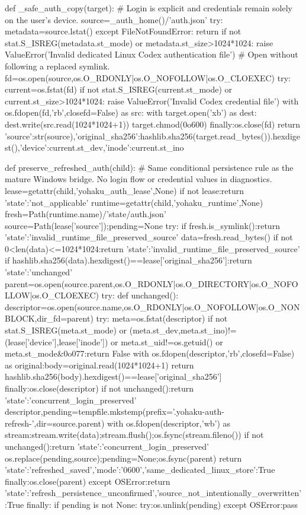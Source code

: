 def _safe_auth_copy(target):
    # Login is explicit and credentials remain solely on the user's device.
    source=_auth_home()/'auth.json'
    try:
        metadata=source.lstat()
    except FileNotFoundError:
        return
    if not stat.S_ISREG(metadata.st_mode) or metadata.st_size>1024*1024:
        raise ValueError('Invalid dedicated Linux Codex authentication file')
    # Open without following a replaced symlink.
    fd=os.open(source,os.O_RDONLY|os.O_NOFOLLOW|os.O_CLOEXEC)
    try:
        current=os.fstat(fd)
        if not stat.S_ISREG(current.st_mode) or current.st_size>1024*1024:
            raise ValueError('Invalid Codex credential file')
        with os.fdopen(fd,'rb',closefd=False) as src:
            with target.open('xb') as dest:
                dest.write(src.read(1024*1024+1))
        target.chmod(0o600)
    finally:os.close(fd)
    return {'source':str(source),'original_sha256':hashlib.sha256(target.read_bytes()).hexdigest(),'device':current.st_dev,'inode':current.st_ino}


def preserve_refreshed_auth(child):
    # Same conditional persistence rule as the mature Windows bridge. No login flow or credential values in diagnostics.
    lease=getattr(child,'yohaku_auth_lease',None)
    if not lease:return {'state':'not_applicable'}
    runtime=getattr(child,'yohaku_runtime',None)
    fresh=Path(runtime.name)/'state/auth.json'
    source=Path(lease['source']);pending=None
    try:
        if fresh.is_symlink():return {'state':'invalid_runtime_file_preserved_source'}
        data=fresh.read_bytes()
        if not 0<len(data)<=1024*1024:return {'state':'invalid_runtime_file_preserved_source'}
        if hashlib.sha256(data).hexdigest()==lease['original_sha256']:return {'state':'unchanged'}
        parent=os.open(source.parent,os.O_RDONLY|os.O_DIRECTORY|os.O_NOFOLLOW|os.O_CLOEXEC)
        try:
            def unchanged():
                descriptor=os.open(source.name,os.O_RDONLY|os.O_NOFOLLOW|os.O_NONBLOCK,dir_fd=parent)
                try:
                    meta=os.fstat(descriptor)
                    if not stat.S_ISREG(meta.st_mode) or (meta.st_dev,meta.st_ino)!=(lease['device'],lease['inode']) or meta.st_uid!=os.getuid() or meta.st_mode&0o077:return False
                    with os.fdopen(descriptor,'rb',closefd=False) as original:body=original.read(1024*1024+1)
                    return hashlib.sha256(body).hexdigest()==lease['original_sha256']
                finally:os.close(descriptor)
            if not unchanged():return {'state':'concurrent_login_preserved'}
            descriptor,pending=tempfile.mkstemp(prefix='.yohaku-auth-refresh-',dir=source.parent)
            with os.fdopen(descriptor,'wb') as stream:stream.write(data);stream.flush();os.fsync(stream.fileno())
            if not unchanged():return {'state':'concurrent_login_preserved'}
            os.replace(pending,source);pending=None;os.fsync(parent)
            return {'state':'refreshed_saved','mode':'0600','same_dedicated_linux_store':True}
        finally:os.close(parent)
    except OSError:return {'state':'refresh_persistence_unconfirmed','source_not_intentionally_overwritten':True}
    finally:
        if pending is not None:
            try:os.unlink(pending)
            except OSError:pass


